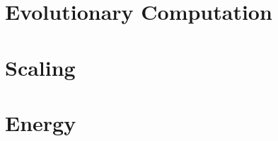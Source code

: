 \documentclass[]{article}
\begin{document}
\section{Evolutionary Computation}

\cite{mitchell1998introduction}
\cite{eiben2003introduction}
\cite{holland1992adaptation}
\cite{forrest1993genetic}
\cite{ma2014novo}
\cite{marshall2014evolution}


\section{Scaling}

\cite{anderson2013altered}
\cite{damuth1981population}
\cite{enquist1998allometric}
\cite{enquist2012land}
\cite{marquet2005scaling}
\cite{schmidt1984scaling}
\cite{tucker2014evolutionary}
\cite{west1997general}

\section{Energy}

\cite{odum1976energy}
\cite{odum1983systems}
\cite{schmidt1997animal}
\cite{brown2004toward}
\cite{sibly2012metabolic}
\cite{ernest2003thermodynamic}
\cite{savage2004predominance}
\cite{dell2011systematic}
\cite{kempes2017thermodynamic}


\printglossaries

 


\end{document}
